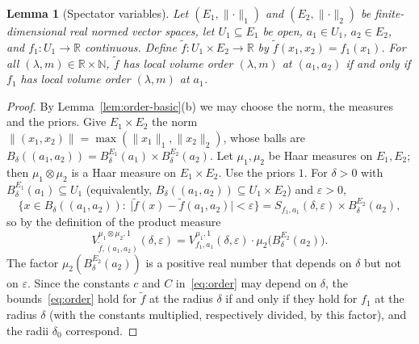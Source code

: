 \documentclass[11pt,a4paper]{article}
\newtheorem{lemma}[theorem]{Lemma}
\theoremstyle{definition}
\theoremstyle{remark}
\numberwithin{equation}{section}
\newcommand{\N}{\mathbb{N}}
\newcommand{\R}{\mathbb{R}}
\newcommand{\norm}[1]{\lVert #1\rVert}
\newcommand{\abs}[1]{\lvert #1\rvert}
\newcommand{\eps}{\varepsilon}
\begin{document}
\begin{lemma}[Spectator variables]\label{lem:spectator}
Let $(E_1,\norm\cdot_1)$ and $(E_2,\norm\cdot_2)$ be finite-dimensional real normed vector spaces, let $U_1\subseteq E_1$ be open, $a_1\in U_1$, $a_2\in E_2$, and $f_1:U_1\to\R$ continuous. Define $\tilde f:U_1\times E_2\to\R$ by $\tilde f(x_1,x_2)=f_1(x_1)$. For all $(\lambda,m)\in\R\times\N$, $\tilde f$ has local volume order $(\lambda,m)$ at $(a_1,a_2)$ if and only if $f_1$ has local volume order $(\lambda,m)$ at $a_1$.
\end{lemma}
\begin{proof}
By Lemma~\ref{lem:order-basic}(b) we may choose the norm, the measures and the priors. Give $E_1\times E_2$ the norm $\norm{(x_1,x_2)}=\max(\norm{x_1}_1,\norm{x_2}_2)$, whose balls are $B_\delta((a_1,a_2))=B^{E_1}_\delta(a_1)\times B^{E_2}_\delta(a_2)$. Let $\mu_1,\mu_2$ be Haar measures on $E_1,E_2$; then $\mu_1\otimes\mu_2$ is a Haar measure on $E_1\times E_2$. Use the priors $1$. For $\delta>0$ with $B^{E_1}_\delta(a_1)\subseteq U_1$ (equivalently, $B_\delta((a_1,a_2))\subseteq U_1\times E_2$) and $\eps>0$,
\[
\{x\in B_\delta((a_1,a_2)):\ \abs{\tilde f(x)-\tilde f(a_1,a_2)}<\eps\}=S_{f_1,a_1}(\delta,\eps)\times B^{E_2}_\delta(a_2),
\]
so by the definition of the product measure
\[
V^{\mu_1\otimes\mu_2,1}_{\tilde f,(a_1,a_2)}(\delta,\eps)=V^{\mu_1,1}_{f_1,a_1}(\delta,\eps)\cdot\mu_2\bigl(B^{E_2}_\delta(a_2)\bigr).
\]
The factor $\mu_2(B^{E_2}_\delta(a_2))$ is a positive real number that depends on $\delta$ but not on $\eps$. Since the constants $c$ and $C$ in~\eqref{eq:order} may depend on $\delta$, the bounds~\eqref{eq:order} hold for $\tilde f$ at the radius $\delta$ if and only if they hold for $f_1$ at the radius $\delta$ (with the constants multiplied, respectively divided, by this factor), and the radii $\delta_0$ correspond.
\end{proof}
\end{document}
